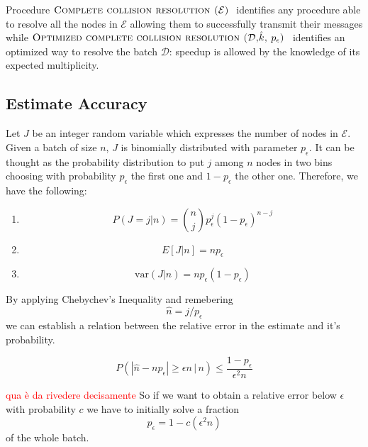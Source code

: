 \documentclass[12pt,a4paper,twocolumns]{report}
\newcommand{\pc}{p_{\epsilon}}
\newcommand{\algname}[1]{\ensuremath{\mbox{\sc #1}}}
\begin{document}
 Procedure \algname{Complete collision resolution ($\mathcal{E}$) } identifies any procedure able to resolve all the nodes in $\mathcal{E}$ allowing them to successfully transmit their messages while \algname{Optimized complete collision resolution ($\mathcal{D}$,$\hat{k}$, $\pc$) } identifies an optimized way to resolve the batch $\mathcal{D}$: speedup is allowed by the knowledge of its expected multiplicity. 

\subsection{Estimate Accuracy}
\label{cidon-estimate-accuracy}
Let $J$ be an integer random variable which expresses the number of nodes in $\mathcal{E}$. Given a batch of size $n$, $J$ is binomially distributed with parameter $\pc$. It can be thought as the probability distribution to put $j$ among  $n$ nodes in two bins choosing with probability $\pc$ the first one and $1-\pc$ the other one.  Therefore, we have the following:

\begin{enumerate}[1)]
\item \begin{equation}P(J=j|n)={n \choose j}\pc^{j}(1-\pc)^{n-j}\end{equation}
\item \begin{equation}E[J|n]=n\pc\label{cidon-e-estimate}\end{equation}
\item \begin{equation}\textrm{var}(J|n)=n\pc(1-\pc)\end{equation}
\end{enumerate}

By applying Chebychev's Inequality and remebering 
\begin{equation} 
\hat{n}=j/\pc 
\end{equation}
 we can establish a relation between the relative error in the estimate and it's probability.  
 
 \begin{equation}
P\left( \left| \hat{n}-n\pc\right| \geq \epsilon n \,|\, n \right) \leq \frac{1-\pc}{\epsilon^{2}n}
 \end{equation}

\textcolor{red}{qua è da rivedere decisamente}
So if we want to obtain a relative error below $\epsilon$ with probability $c$ we have to initially solve a fraction
\begin{equation}
\pc=1-c(\epsilon^{2}n)
\end{equation}
of the whole batch.
\end{document}
